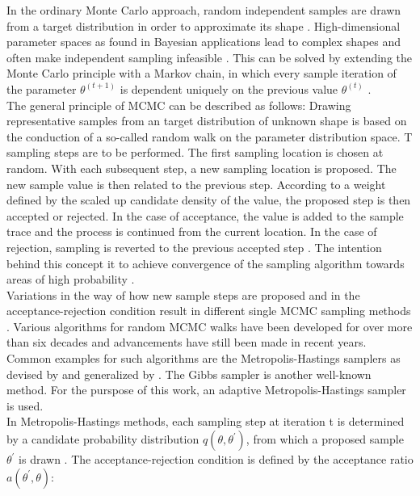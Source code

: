         In the ordinary Monte Carlo approach, random independent samples are drawn from a target distribution in order to approximate its shape \citep{gilks2005markov, delaVarga2016}. High-dimensional parameter spaces as found in Bayesian applications lead to complex shapes and often make independent sampling infeasible \citep{gilks2005markov}. This can be solved by extending the Monte Carlo principle with a Markov chain, in which every sample iteration of the parameter $\theta^{(t+1)}$ is dependent uniquely on the previous value $\theta^{(t)}$ \citep{gilks2005markov, delaVarga2016}.\\
        The general principle of MCMC can be described as follows: 
        Drawing representative samples from an target distribution of unknown shape is based on the conduction of a so-called random walk on the parameter distribution space. T sampling steps are to be performed. The first sampling location is chosen at random. With each subsequent step, a new sampling location is proposed. The new sample value is then related to the previous step. According to a weight defined by the scaled up candidate density of the value, the proposed step is then accepted or rejected. In the case of acceptance, the value is added to the sample trace and the process is continued from the current location. In the case of rejection, sampling is reverted to the previous accepted step \citep{schaaf2017, delaVarga2016}. The intention behind this concept it to achieve convergence of the sampling algorithm towards areas of high probability \citep{davidson2015}.\\ Variations in the way of how new  sample steps are proposed and in the acceptance-rejection condition result in different single MCMC sampling methods \citep{schaaf2017, delaVarga2016}. Various algorithms for random MCMC walks have been developed for over more than six decades and advancements have still been made in recent years. Common examples for such algorithms are the Metropolis-Hastings samplers as devised by \citet{metropolis1953equation} and generalized by \citet{hastings1970}. The Gibbs sampler \citep{geman1984stochastic} is another well-known method. 
        For the purspose of this work, an adaptive Metropolis-Hastings sampler is used.\\
        In Metropolis-Hastings methods, each sampling step at iteration t is determined by a candidate probability distribution $q(\theta,\theta^{'})$, from which a proposed sample $\theta^{'}$ is drawn \citep{delaVarga2016}. The acceptance-rejection condition is defined by the acceptance ratio $a(\theta^{'},\theta)$:
        
